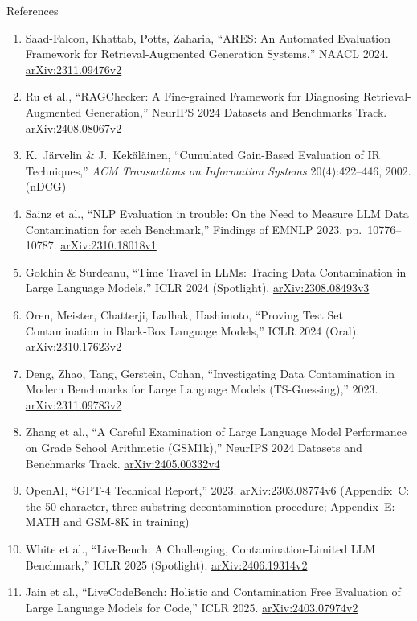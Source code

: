 \begin{frame}[allowframebreaks]{References}
\begin{enumerate}
    \item Saad-Falcon, Khattab, Potts, Zaharia, ``ARES: An Automated Evaluation Framework for Retrieval-Augmented Generation Systems,'' NAACL 2024. \href{https://arxiv.org/abs/2311.09476v2}{arXiv:2311.09476v2}
    \item Ru et al., ``RAGChecker: A Fine-grained Framework for Diagnosing Retrieval-Augmented Generation,'' NeurIPS 2024 Datasets and Benchmarks Track. \href{https://arxiv.org/abs/2408.08067v2}{arXiv:2408.08067v2}
    \item K.~J\"arvelin \& J.~Kek\"al\"ainen, ``Cumulated Gain-Based Evaluation of IR Techniques,'' \textit{ACM Transactions on Information Systems} 20(4):422--446, 2002. (nDCG)
    \item Sainz et al., ``NLP Evaluation in trouble: On the Need to Measure LLM Data Contamination for each Benchmark,'' Findings of EMNLP 2023, pp.~10776--10787. \href{https://arxiv.org/abs/2310.18018v1}{arXiv:2310.18018v1}
    \item Golchin \& Surdeanu, ``Time Travel in LLMs: Tracing Data Contamination in Large Language Models,'' ICLR 2024 (Spotlight). \href{https://arxiv.org/abs/2308.08493v3}{arXiv:2308.08493v3}
    \item Oren, Meister, Chatterji, Ladhak, Hashimoto, ``Proving Test Set Contamination in Black-Box Language Models,'' ICLR 2024 (Oral). \href{https://arxiv.org/abs/2310.17623v2}{arXiv:2310.17623v2}
    \item Deng, Zhao, Tang, Gerstein, Cohan, ``Investigating Data Contamination in Modern Benchmarks for Large Language Models (TS-Guessing),'' 2023. \href{https://arxiv.org/abs/2311.09783v2}{arXiv:2311.09783v2}
    \item Zhang et al., ``A Careful Examination of Large Language Model Performance on Grade School Arithmetic (GSM1k),'' NeurIPS 2024 Datasets and Benchmarks Track. \href{https://arxiv.org/abs/2405.00332v4}{arXiv:2405.00332v4}
    \item OpenAI, ``GPT-4 Technical Report,'' 2023. \href{https://arxiv.org/abs/2303.08774v6}{arXiv:2303.08774v6} (Appendix~C: the 50-character, three-substring decontamination procedure; Appendix~E: MATH and GSM-8K in training)
    \item White et al., ``LiveBench: A Challenging, Contamination-Limited LLM Benchmark,'' ICLR 2025 (Spotlight). \href{https://arxiv.org/abs/2406.19314v2}{arXiv:2406.19314v2}
    \item Jain et al., ``LiveCodeBench: Holistic and Contamination Free Evaluation of Large Language Models for Code,'' ICLR 2025. \href{https://arxiv.org/abs/2403.07974v2}{arXiv:2403.07974v2}

\end{enumerate}
\end{frame}
